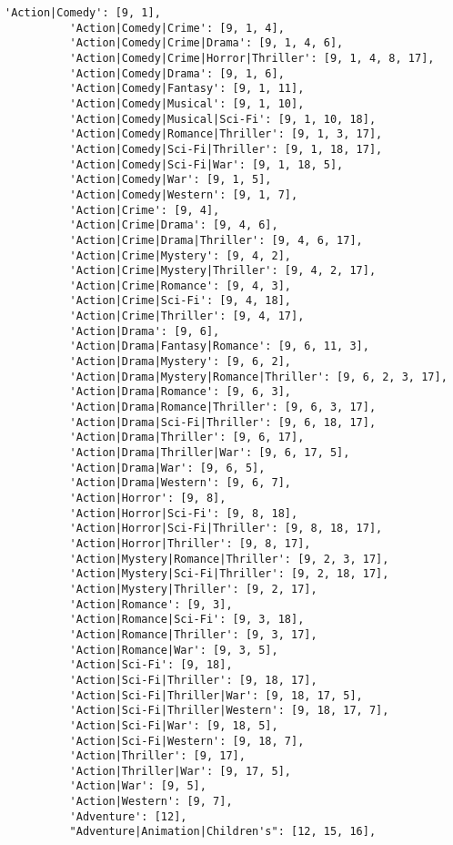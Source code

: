 \documentclass[11pt]{article}
\begin{document}
\begin{Verbatim}[commandchars=\\\{\}]
          'Action|Comedy': [9, 1],
          'Action|Comedy|Crime': [9, 1, 4],
          'Action|Comedy|Crime|Drama': [9, 1, 4, 6],
          'Action|Comedy|Crime|Horror|Thriller': [9, 1, 4, 8, 17],
          'Action|Comedy|Drama': [9, 1, 6],
          'Action|Comedy|Fantasy': [9, 1, 11],
          'Action|Comedy|Musical': [9, 1, 10],
          'Action|Comedy|Musical|Sci-Fi': [9, 1, 10, 18],
          'Action|Comedy|Romance|Thriller': [9, 1, 3, 17],
          'Action|Comedy|Sci-Fi|Thriller': [9, 1, 18, 17],
          'Action|Comedy|Sci-Fi|War': [9, 1, 18, 5],
          'Action|Comedy|War': [9, 1, 5],
          'Action|Comedy|Western': [9, 1, 7],
          'Action|Crime': [9, 4],
          'Action|Crime|Drama': [9, 4, 6],
          'Action|Crime|Drama|Thriller': [9, 4, 6, 17],
          'Action|Crime|Mystery': [9, 4, 2],
          'Action|Crime|Mystery|Thriller': [9, 4, 2, 17],
          'Action|Crime|Romance': [9, 4, 3],
          'Action|Crime|Sci-Fi': [9, 4, 18],
          'Action|Crime|Thriller': [9, 4, 17],
          'Action|Drama': [9, 6],
          'Action|Drama|Fantasy|Romance': [9, 6, 11, 3],
          'Action|Drama|Mystery': [9, 6, 2],
          'Action|Drama|Mystery|Romance|Thriller': [9, 6, 2, 3, 17],
          'Action|Drama|Romance': [9, 6, 3],
          'Action|Drama|Romance|Thriller': [9, 6, 3, 17],
          'Action|Drama|Sci-Fi|Thriller': [9, 6, 18, 17],
          'Action|Drama|Thriller': [9, 6, 17],
          'Action|Drama|Thriller|War': [9, 6, 17, 5],
          'Action|Drama|War': [9, 6, 5],
          'Action|Drama|Western': [9, 6, 7],
          'Action|Horror': [9, 8],
          'Action|Horror|Sci-Fi': [9, 8, 18],
          'Action|Horror|Sci-Fi|Thriller': [9, 8, 18, 17],
          'Action|Horror|Thriller': [9, 8, 17],
          'Action|Mystery|Romance|Thriller': [9, 2, 3, 17],
          'Action|Mystery|Sci-Fi|Thriller': [9, 2, 18, 17],
          'Action|Mystery|Thriller': [9, 2, 17],
          'Action|Romance': [9, 3],
          'Action|Romance|Sci-Fi': [9, 3, 18],
          'Action|Romance|Thriller': [9, 3, 17],
          'Action|Romance|War': [9, 3, 5],
          'Action|Sci-Fi': [9, 18],
          'Action|Sci-Fi|Thriller': [9, 18, 17],
          'Action|Sci-Fi|Thriller|War': [9, 18, 17, 5],
          'Action|Sci-Fi|Thriller|Western': [9, 18, 17, 7],
          'Action|Sci-Fi|War': [9, 18, 5],
          'Action|Sci-Fi|Western': [9, 18, 7],
          'Action|Thriller': [9, 17],
          'Action|Thriller|War': [9, 17, 5],
          'Action|War': [9, 5],
          'Action|Western': [9, 7],
          'Adventure': [12],
          "Adventure|Animation|Children's": [12, 15, 16],

\end{Verbatim}
\end{document}
